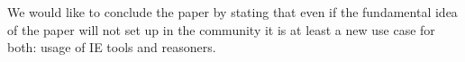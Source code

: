 \documentclass[10pt, conference, compsocconf]{IEEEtran}
\begin{document}
We would like to conclude the paper by stating that even if the fundamental idea of the paper will not set up in the community it is at least a new use case for both: usage of IE tools and reasoners.























%
%



%
%
\end{document}
